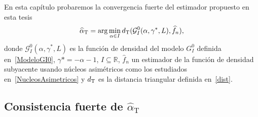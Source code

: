 En esta capítulo probaremos la convergencia fuerte del estimador propuesto en esta tesis 
\begin{align}
\label{EstMinDist}
\widehat{\alpha}_{\text{T}}=\arg\min\limits_{\alpha \in I}d_{\tiny{\text{T}}}(\mathcal{G}_I^0(\alpha,\gamma^*,L),\widehat{f}_n),
\end{align}
donde $\mathcal{G}_I^0(\alpha,\gamma^*,L)$ es la función de densidad del modelo $G_I^0$ definida en~\ref{ModeloGI0}, $\gamma*=-\alpha-1$, $I \subseteq \mathbb{R}$, $\widehat{f}_n$ un estimador de la función de densidad subyacente usando núcleos asimétricos como los estudiados en~\ref{NucleosAsimetricos} y $d_{\tiny{\text{T}}}$ es la distancia triangular definida en~\ref{dist}.


\subsection{Consistencia fuerte de $\widehat{\alpha}_{\text{T}}$}





